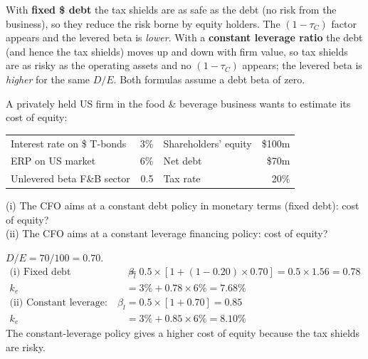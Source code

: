 \begin{addbox}
With \textbf{fixed \$ debt} the tax shields are as safe as the debt (no risk from the business), so they reduce the risk borne by equity holders. The $(1-\tau_C)$ factor appears and the levered beta is \emph{lower}. With a \textbf{constant leverage ratio} the debt (and hence the tax shields) moves up and down with firm value, so tax shields are as risky as the operating assets and no $(1-\tau_C)$ appears; the levered beta is \emph{higher} for the same $D/E$. Both formulas assume a debt beta of zero.
\end{addbox}

\begin{exbox}
A privately held US firm in the food \& beverage business wants to estimate its cost of equity:
\begin{center}
\begin{tabular}{@{}lr@{\hspace{1cm}}lr@{}}
Interest rate on \$ T-bonds & 3\% & Shareholders' equity & \$100m\\
ERP on US market & 6\% & Net debt & \$70m\\
Unlevered beta F\&B sector & 0.5 & Tax rate & 20\%\\
\end{tabular}
\end{center}
(i) The CFO aims at a constant debt policy in monetary terms (fixed debt): cost of equity?\\
(ii) The CFO aims at a constant leverage financing policy: cost of equity?
\end{exbox}
\begin{exbox}
$D/E = 70/100 = 0.70$.
\begin{align*}
\text{(i) Fixed debt (Hamada):}\quad \beta_l &= 0.5\times[1+(1-0.20)\times0.70] = 0.5\times1.56 = \mathbf{0.78}\\
k_e &= 3\% + 0.78\times6\% = \mathbf{7.68\%}\\
\text{(ii) Constant leverage:}\quad \beta_l &= 0.5\times[1+0.70] = \mathbf{0.85}\\
k_e &= 3\% + 0.85\times6\% = \mathbf{8.10\%}
\end{align*}
The constant-leverage policy gives a higher cost of equity because the tax shields are risky.
\end{exbox}

